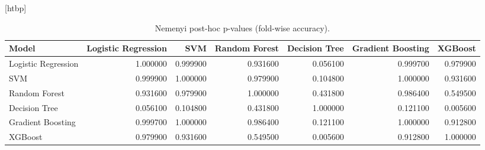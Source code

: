 \begin{table}
\small[htbp]
\caption{Nemenyi post-hoc p-values (fold-wise accuracy).}
\label{tab:A02b_nemenyi}
\begin{tabular}{lrrrrrr}
\toprule
Model & Logistic Regression & SVM & Random Forest & Decision Tree & Gradient Boosting & XGBoost \\
\midrule
Logistic Regression & 1.000000 & 0.999900 & 0.931600 & 0.056100 & 0.999700 & 0.979900 \\
SVM & 0.999900 & 1.000000 & 0.979900 & 0.104800 & 1.000000 & 0.931600 \\
Random Forest & 0.931600 & 0.979900 & 1.000000 & 0.431800 & 0.986400 & 0.549500 \\
Decision Tree & 0.056100 & 0.104800 & 0.431800 & 1.000000 & 0.121100 & 0.005600 \\
Gradient Boosting & 0.999700 & 1.000000 & 0.986400 & 0.121100 & 1.000000 & 0.912800 \\
XGBoost & 0.979900 & 0.931600 & 0.549500 & 0.005600 & 0.912800 & 1.000000 \\
\bottomrule
\end{tabular}
\end{table}
